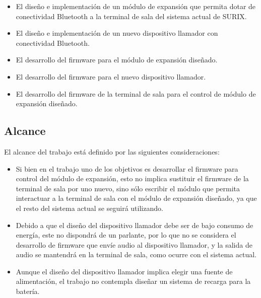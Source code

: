 \begin{itemize}

\item El diseño e implementación de un módulo de expansión que permita dotar de conectividad Bluetooth a la terminal de sala del sistema actual de SURIX.

\item El diseño e implementación de un nuevo dispositivo llamador con conectividad Bluetooth.

\item El desarrollo del firmware para el módulo de expansión diseñado.

\item El desarrollo del firmware para el nuevo dispositivo llamador.

\item El desarrollo del firmware de la terminal de sala para el control de módulo de expansión diseñado.

\end{itemize}

\subsection{Alcance}

El alcance del trabajo está definido por las siguientes consideraciones:

\begin{itemize}
\item Si bien en el trabajo uno de los objetivos es desarrollar el firmware para control del módulo de expansión, esto no implica sustituir el firmware de la terminal de sala por uno nuevo, sino sólo escribir el módulo que permita interactuar a la terminal de sala con el módulo de expansión diseñado, ya que el resto del sistema actual se seguirá utilizando.	

\item Debido a que el diseño del dispositivo llamador debe ser de bajo consumo de energía, este no dispondrá de un parlante, por lo que no se considera el desarrollo de firmware que envíe audio al dispositivo llamador, y la salida de audio se mantendrá en la terminal de sala, como ocurre con el sistema actual.

\item Aunque el diseño del dispositivo llamador implica elegir una fuente de alimentación, el trabajo no contempla diseñar un sistema de recarga para la batería.

\end{itemize}

